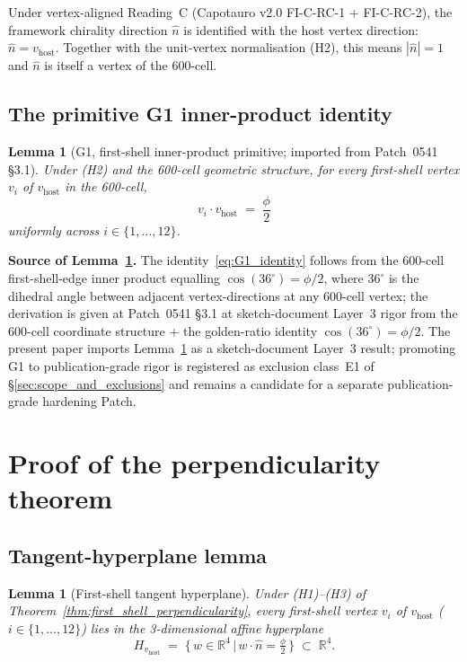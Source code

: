 \documentclass[11pt,letterpaper]{article}
\newtheorem{lemma}[theorem]{Lemma}
\newcommand{\nhat}{\hat{n}}
\newcommand{\vhost}{v_{\text{host}}}
\newcommand{\Reals}{\mathbb{R}}
\newcommand{\Hperp}{H_{\vhost}}
\begin{document}
Under vertex-aligned Reading~C (Capotauro v2.0 FI-C-RC-1 + FI-C-RC-2), the framework chirality direction $\nhat$ is identified with the host vertex direction: $\nhat = \vhost$. Together with the unit-vertex normalisation (H2), this means $|\nhat| = 1$ and $\nhat$ is itself a vertex of the 600-cell.

\subsection{The primitive G1 inner-product identity}\label{sec:g1_primitive}

\begin{lemma}[G1, first-shell inner-product primitive; imported from Patch~0541 \S3.1]\label{lem:G1}
Under (H2) and the 600-cell geometric structure, for every first-shell vertex $v_i$ of $\vhost$ in the 600-cell,
\begin{equation}\label{eq:G1_identity}
v_i \cdot \vhost \;=\; \frac{\phi}{2}
\end{equation}
uniformly across $i \in \{1, \ldots, 12\}$.
\end{lemma}

\noindent\textbf{Source of Lemma~\ref{lem:G1}.} The identity~\eqref{eq:G1_identity} follows from the 600-cell first-shell-edge inner product equalling $\cos(36^\circ) = \phi/2$, where $36^\circ$ is the dihedral angle between adjacent vertex-directions at any 600-cell vertex; the derivation is given at Patch~0541 \S3.1 at sketch-document Layer~3 rigor from the 600-cell coordinate structure + the golden-ratio identity $\cos(36^\circ) = \phi/2$. The present paper imports Lemma~\ref{lem:G1} as a sketch-document Layer~3 result; promoting G1 to publication-grade rigor is registered as exclusion class~E1 of \S\ref{sec:scope_and_exclusions} and remains a candidate for a separate publication-grade hardening Patch.

\section{Proof of the perpendicularity theorem}\label{sec:proof}

\subsection{Tangent-hyperplane lemma}\label{sec:tangent_hyperplane_lemma}

\begin{lemma}[First-shell tangent hyperplane]\label{lem:tangent_hyperplane}
Under (H1)--(H3) of Theorem~\ref{thm:first_shell_perpendicularity}, every first-shell vertex $v_i$ of $\vhost$ ($i \in \{1, \ldots, 12\}$) lies in the 3-dimensional affine hyperplane
\begin{equation}\label{eq:tangent_hyperplane}
\Hperp \;=\; \bigl\{\, w \in \Reals^4 \,\big|\, w \cdot \nhat = \tfrac{\phi}{2}\,\bigr\} \;\subset\; \Reals^4.
\end{equation}
\end{lemma}
\end{document}
